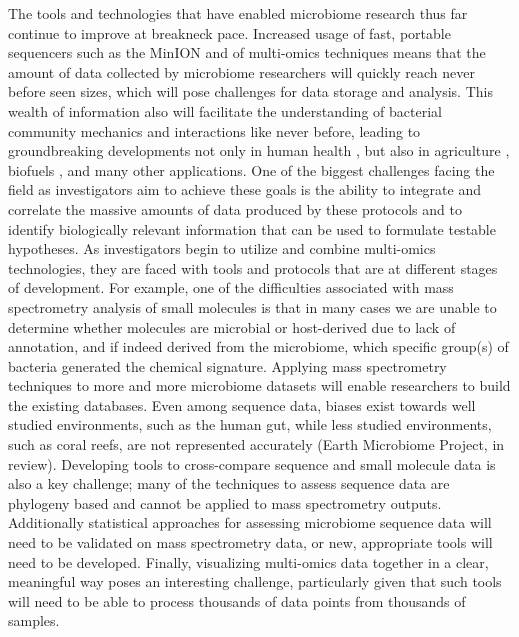The tools and technologies that have enabled microbiome research thus far continue to improve at breakneck pace. Increased usage of fast, portable sequencers such as the MinION and of multi-omics techniques means that the amount of data collected by microbiome researchers will quickly reach never before seen sizes, which will pose challenges for data storage and analysis. This wealth of information also will facilitate the understanding of bacterial community mechanics and interactions like never before, leading to groundbreaking developments not only in human health \cite{VanNood2013, Cox2015, Ling2015}, but also in agriculture \cite{Sessitsch2015}, biofuels \cite{Hess2011}, and many other applications. One of the biggest challenges facing the field as investigators aim to achieve these goals is the ability to integrate and correlate the massive amounts of data produced by these protocols and to identify biologically relevant information that can be used to formulate testable hypotheses.
As investigators begin to utilize and combine multi-omics technologies, they are faced with tools and protocols that are at different stages of development. For example, one of the difficulties associated with mass spectrometry analysis of small molecules is that in many cases we are unable to determine whether molecules are microbial or host-derived due to lack of annotation, and if indeed derived from the microbiome, which specific group(s) of bacteria generated the chemical signature. Applying mass spectrometry techniques to more and more microbiome datasets will enable researchers to build the existing databases. Even among sequence data, biases exist towards well studied environments, such as the human gut, while less studied environments, such as coral reefs, are not represented accurately (Earth Microbiome Project, in review). Developing tools to cross-compare sequence and small molecule data is also a key challenge; many of the techniques to assess sequence data are phylogeny based and cannot be applied to mass spectrometry outputs. Additionally statistical approaches for assessing microbiome sequence data \cite{Mortone00162-16, Mandal2015} will need to be validated on mass spectrometry data, or new, appropriate tools will need to be developed. Finally, visualizing multi-omics data together in a clear, meaningful way poses an interesting challenge, particularly given that such tools will need to be able to process thousands of data points from thousands of samples.
